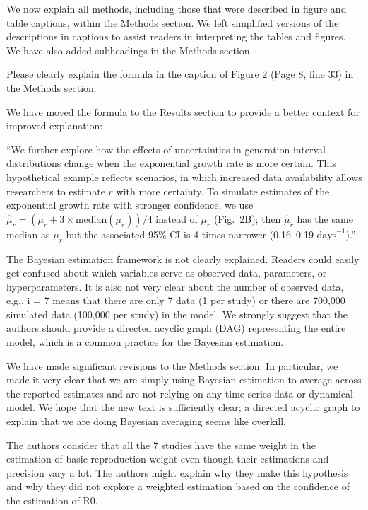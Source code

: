 \documentclass[12pt]{article}
\newcommand{\revtext}{\textsf}
\begin{document}
We now explain all methods, including those that were described in figure and table captions, within the Methods section.
We left simplified versions of the descriptions in captions to assist readers in interpreting the tables and figures.
We have also added subheadings in the Methods section.

\revtext{Please clearly explain the formula in the caption of Figure 2 (Page 8, line 33) in the Methods
section.}

We have moved the formula to the Results section to provide a better context for improved explanation: 

``We further explore how the effects of uncertainties in generation-interval distributions change when the exponential growth rate is more certain.
This hypothetical example reflects scenarios, in which increased data availability allows researchers to estimate $r$ with more certainty.
To simulate estimates of the exponential growth rate with stronger confidence, we use $\hat{\mu}_r = (\mu_r + 3\times\mathrm{median}(\mu_r))/4$ instead of $\mu_r$ (Fig.~2B); 
then $\hat{\mu}_r$ has the same median as $\mu_r$ but the associated 95\% CI is 4 times narrower (0.16--0.19 $\textrm{days}^{-1}$).''

\revtext{The Bayesian estimation framework is not clearly explained. Readers could easily get confused
about which variables serve as observed data, parameters, or hyperparameters. It is also not
very clear about the number of observed data, e.g., i = 7 means that there are only 7 data (1 per
study) or there are 700,000 simulated data (100,000 per study) in the model. We strongly
suggest that the authors should provide a directed acyclic graph (DAG) representing the entire
model, which is a common practice for the Bayesian estimation.}

We have made significant revisions to the Methods section. 
In particular, we made it very clear that we are simply using Bayesian estimation to average across the reported estimates and are not relying on any time series data or dynamical model.
We hope that the new text is sufficiently clear; a directed acyclic graph to explain that we are doing Bayesian averaging seems like overkill.

\revtext{The authors consider that all the 7 studies have the same weight in the estimation of basic
reproduction weight even though their estimations and precision vary a lot. The authors might
explain why they make this hypothesis and why they did not explore a weighted estimation
based on the confidence of the estimation of R0.}
\end{document}
